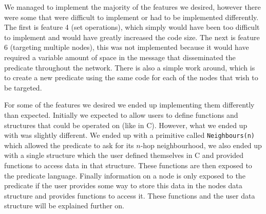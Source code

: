 We managed to implement the majority of the features we desired, however there were some that were difficult to implement or had to be implemented differently. The first is feature 4 (set operations), which simply would have been too difficult to implement and would have greatly increased the code size. The next is feature 6 (targeting multiple nodes), this was not implemented because it would have required a variable amount of space in the message that disseminated the predicate throughout the network. There is also a simple work around, which is to create a new predicate using the same code for each of the nodes that wish to be targeted.

For some of the features we desired we ended up implementing them differently than expected. Initially we expected to allow users to define functions and structures that could be operated on (like in C). However, what we ended up with was slightly different. We ended up with a primitive called \verb|Neighbours(n)| which allowed the predicate to ask for its $n$-hop neighbourhood, we also ended up with a single structure which the user defined themselves in C and provided functions to access data in that structure. These functions are then exposed to the predicate language. Finally information on a node is only exposed to the predicate if the user provides some way to store this data in the nodes data structure and provides functions to access it. These functions and the user data structure will be explained further on.


